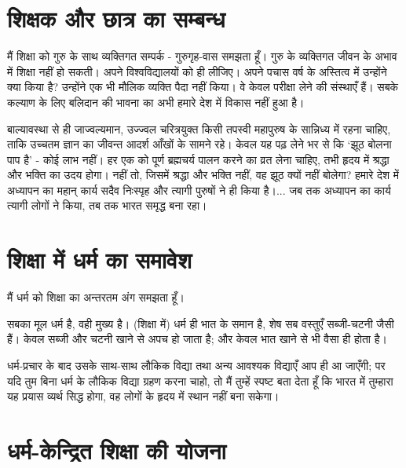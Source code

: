 \section*{शिक्षक और छात्र का सम्बन्ध}


मैं शिक्षा को गुरु के साथ व्यक्तिगत सम्पर्क - गुरुगृह-वास समझता हूँ। गुरु के व्यक्तिगत जीवन के अभाव में शिक्षा नहीं हो सकती। अपने विश्वविद्यालयों को ही लीजिए। अपने पचास वर्ष के अस्तित्व में उन्होंने क्या किया है? उन्होंने एक भी मौलिक व्यक्ति पैदा नहीं किया। वे केवल परीक्षा लेने की संस्थाएँ हैं। सबके कल्याण के लिए बलिदान की भावना का अभी हमारे देश में विकास नहीं हुआ है। 

\newpage

बाल्यावस्था से ही जाज्वल्यमान, उज्ज्वल चरित्रयुक्त किसी तपस्वी महापुरुष के सान्निध्य में रहना चाहिए, ताकि उच्चतम ज्ञान का जीवन्त आदर्श आँखों के सामने रहे। केवल यह पढ़ लेने भर से कि ‘झूठ बोलना पाप है’ - कोई लाभ नहीं। हर एक को पूर्ण ब्रह्मचर्य पालन करने का व्रत लेना चाहिए, तभी हृदय में श्रद्धा और भक्ति का उदय होगा। नहीं तो, जिसमें श्रद्धा और भक्ति नहीं, वह झूठ क्यों नहीं बोलेगा? हमारे देश में अध्यापन का महान् कार्य सदैव निःस्पृह और त्यागी पुरुषों ने ही किया है।... जब तक अध्यापन का कार्य त्यागी लोगों ने किया, तब तक भारत समृद्ध बना रहा।


\section*{शिक्षा में धर्म का समावेश}


मैं धर्म को शिक्षा का अन्तरतम अंग समझता हूँ। 

सबका मूल धर्म है, वही मुख्य है। (शिक्षा में) धर्म ही भात के समान है, शेष सब वस्तुएँ सब्जी-चटनी जैसी हैं। केवल सब्जी और चटनी खाने से अपच हो जाता है; और केवल भात खाने से भी वैसा ही होता है। 

धर्म-प्रचार के बाद उसके साथ-साथ लौकिक विद्या तथा अन्य आवश्यक विद्याएँ आप ही आ जाएँगी; पर यदि तुम बिना धर्म के लौकिक विद्या ग्रहण करना चाहो, तो मैं तुम्हें स्पष्ट बता देता हूँ कि भारत में तुम्हारा यह प्रयास व्यर्थ सिद्ध होगा, वह लोगों के हृदय में स्थान नहीं बना सकेगा।


\section*{धर्म-केन्द्रित शिक्षा की योजना}

